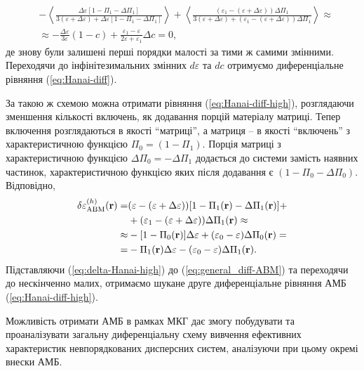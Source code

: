 \documentclass[14pt,twoside]{vakthesis}
\begin{document}
\begin{align}
&-\left\langle \frac{\Delta\varepsilon [1 - \Pi_1 - \Delta \Pi_1]}{3(\varepsilon + \Delta\varepsilon) + \Delta\varepsilon [1 - \Pi_1 - \Delta \Pi_1]} \right\rangle 
+ \left\langle \frac{(\varepsilon_1 - (\varepsilon + \Delta\varepsilon)) \Delta\Pi_1}{3(\varepsilon + \Delta\varepsilon) + (\varepsilon_1 - (\varepsilon + \Delta\varepsilon)) \Delta\Pi_1} \right\rangle \approx \nonumber\\
&\approx - \frac{\Delta\varepsilon}{3\varepsilon} (1 - c) + \frac{\varepsilon_1 - \varepsilon}{2\varepsilon + \varepsilon_1}\Delta c = 0,
\end{align}
де знову були залишені перші порядки малості за тими ж самими змінними. Переходячи до інфінітезимальних змінних $d\varepsilon$ та $dc$ отримуємо диференціальне рівняння (\ref{eq:Hanai-diff}). 

За такою ж схемою можна отримати рівняння (\ref{eq:Hanai-diff-high}), розглядаючи зменшення кількості включень, як додавання порцій матеріалу матриці. Тепер включення розглядаються в якості ``матриці'', а матриця -- в якості ``включень'' з характеристичною функцією $\Pi_0 = (1 - \Pi_1)$. Порція матриці з характеристичною функцією $\Delta\Pi_0 = - \Delta\Pi_1$ додається до системи замість наявних частинок,  характеристичною функцією яких після додавання є $(1 - \Pi_0 - \Delta\Pi_0)$. Відповідно,
\begin{equation}\label{eq:delta-Hanai-high}
\begin{split}
\delta\varepsilon_{\rm ABM}^{(h)} ({\bf r}) =& (\varepsilon - (\varepsilon + \Delta\varepsilon)) [ 1 - \Pi_1 ({\bf r}) - \Delta\Pi_1 ({\bf r})] +\\
&+ (\varepsilon_1 - (\varepsilon + \Delta\varepsilon)) \Delta\Pi_1({\bf r}) \approx \\
\approx& - [ 1 - \Pi_0 ({\bf r}) ] \Delta \varepsilon + (\varepsilon_0 - \varepsilon) \Delta\Pi_0({\bf r}) =\\
=& - \Pi_1 ({\bf r}) \Delta\varepsilon - (\varepsilon_0 - \varepsilon) \Delta\Pi_1({\bf r}).
\end{split}
\end{equation}
Підставляючи (\ref{eq:delta-Hanai-high}) до (\ref{eq:general_diff-ABM})
та переходячи до нескінченно малих, отримаємо шукане друге диференціальне рівняння АМБ (\ref{eq:Hanai-diff-high}).

Можливість отримати АМБ в рамках МКГ дає змогу побудувати та проаналізувати загальну диференціальну схему вивчення ефективних характеристик невпорядкованих дисперсних систем, аналізуючи при цьому окремі внески АМБ.
\end{document}
